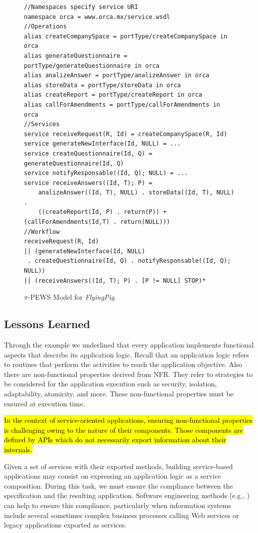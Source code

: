 \documentclass{singlecol-new}
\theoremstyle{TH}{
\newtheorem{lemma}{Lemma}
\newtheorem{theorem}[lemma]{Theorem}
\newtheorem{corrolary}[lemma]{Corrolary}
\newtheorem{conjecture}[lemma]{Conjecture}
\newtheorem{proposition}[lemma]{Proposition}
\newtheorem{claim}[lemma]{Claim}
\newtheorem{stheorem}[lemma]{Wrong Theorem}
\newtheorem{algorithm}{Algorithm}
}
\theoremstyle{THrm}{
\newtheorem{definition}{Definition}[section]
\newtheorem{question}{Question}[section]
\newtheorem{remark}{Remark}
\newtheorem{scheme}{Scheme}
}
\theoremstyle{THhit}{
\newtheorem{case}{Case}[section]
}
\theoremstyle{THhsl}{
\newtheorem{example}{Example}
}
\def\FlyingPig{\textsl{FlyingPig}\xspace}
\begin{document}
\begin{figure}[h]
\begin{scriptsize}
\begin{verbatim}
//Namespaces specify service URI
namespace orca = www.orca.mx/service.wsdl
//Operations
alias createCompanySpace = portType/createCompanySpace in orca
alias generateQuestionnaire = portType/generateQuestionnaire in orca
alias analizeAnswer = portType/analizeAnswer in orca
alias storeData = portType/storeData in orca
alias createReport = portType/createReport in orca
alias callForAmendments = portType/callForAmendments in orca
//Services
service receiveRequest(R, Id) = createCompanySpace(R, Id)
service generateNewInterface(Id, NULL) = ...
service createQuestionnaire(Id, Q) = generateQuestionnaire(Id, Q)
service notifyResponsable((Id, Q); NULL) = ...
service receiveAnswers((Id, T); P) =
	analizeAnswer((Id, T), NULL) . storeData((Id, T), NULL) . 
	((createReport(Id, P) . return(P)) + (callForAmendments(Id,T) . return(NULL)))
//Workflow
receiveRequest(R, Id)
|| (generateNewInterface(Id, NULL)
 . createQuestionnaire(Id, Q) . notifyResponsable((Id, Q); NULL))
|| (receiveAnswers((Id, T); P) . [P != NULL] STOP)*	
\end{verbatim}
\caption{$\pi$-PEWS Model for \FlyingPig.}\label{fig:piPEWSFlyingPig}
\end{scriptsize}
\end{figure}



\subsection{Lessons Learned}

Through the example we underlined that every application implements functional aspects that describe its application logic.
Recall that an application logic refers to routines that perform the activities to reach the application objective.
Also there are non-functional properties derived from NFR. 
They refer to strategies to be considered for the application execution such as security, isolation, adaptability, atomicity, and more.
These non-functional properties must be ensured at execution time.

\hl{In the context of service-oriented applications, ensuring non-functional properties is challenging owing to the nature of their components.
Those components are defined by APIs which do not necessarily export information about their internals.}

Given a set of services with their exported methods, building service-based applications may consist on expressing an application logic as a service composition.
During this task, we must ensure the compliance between the specification and the resulting application.
Software engineering methods (e.g., \cite{2,decastro1,PapazoglouH06}) can help to ensure this compliance, particularly when information systems include several sometimes complex business processes calling Web services or legacy applications exported as services.
\end{document}
